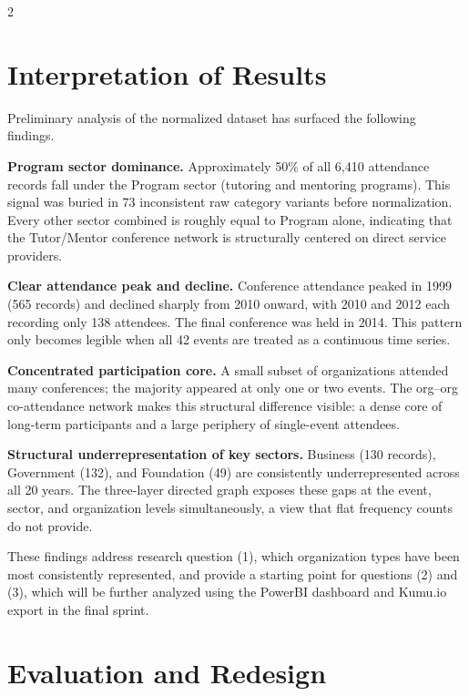 \documentclass[11pt,letterpaper]{article}
\begin{document}
\begin{multicols}{2}
\section{Interpretation of Results}

Preliminary analysis of the normalized dataset has surfaced the following
findings.

\textbf{Program sector dominance.} Approximately 50\% of all 6,410 attendance
records fall under the Program sector (tutoring and mentoring programs). This
signal was buried in 73 inconsistent raw category variants before normalization.
Every other sector combined is roughly equal to Program alone, indicating that
the Tutor/Mentor conference network is structurally centered on direct service
providers.

\textbf{Clear attendance peak and decline.} Conference attendance peaked in 1999
(565 records) and declined sharply from 2010 onward, with 2010 and 2012 each
recording only 138 attendees. The final conference was held in 2014. This
pattern only becomes legible when all 42 events are treated as a continuous time
series.

\textbf{Concentrated participation core.} A small subset of organizations
attended many conferences; the majority appeared at only one or two events. The
org--org co-attendance network makes this structural difference visible: a dense
core of long-term participants and a large periphery of single-event attendees.

\textbf{Structural underrepresentation of key sectors.} Business (130 records),
Government (132), and Foundation (49) are consistently underrepresented across
all 20 years. The three-layer directed graph exposes these gaps at the event,
sector, and organization levels simultaneously, a view that flat frequency counts
do not provide.

These findings address research question (1), which organization types have been
most consistently represented, and provide a starting point for questions (2) and
(3), which will be further analyzed using the PowerBI dashboard and Kumu.io
export in the final sprint.

\section{Evaluation and Redesign}


\end{multicols}
\end{document}
